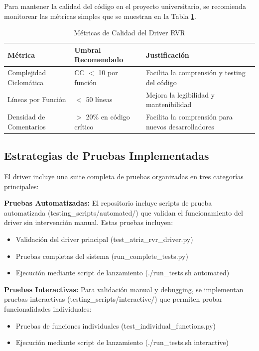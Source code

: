 \documentclass[11pt]{article}
\newcommand{\code}[1]{\textcolor{codeblue}{\url{#1}}}
\numberwithin{figure}{section}
\numberwithin{table}{section}
\def\code#1{#1}%
\begin{document}
Para mantener la calidad del código en el proyecto universitario, se recomienda monitorear las métricas simples que se muestran en la Tabla \ref{tab:metricas_calidad}.

\begin{table}[htbp]
\centering
\caption{Métricas de Calidad del Driver RVR}
\label{tab:metricas_calidad}
\begin{tabular}{|p{}|p{}|p{}|}
\hline
\textbf{Métrica} & \textbf{Umbral Recomendado} & \textbf{Justificación} \\
\hline
Complejidad Ciclomática & CC $<$ 10 por función & Facilita la comprensión y testing del código \\
\hline
Líneas por Función & $<$ 50 líneas & Mejora la legibilidad y mantenibilidad \\
\hline
Densidad de Comentarios & $>$ 20\% en código crítico & Facilita la comprensión para nuevos desarrolladores \\
\hline
\end{tabular}
\end{table}


\subsection{Estrategias de Pruebas Implementadas}

El driver incluye una suite completa de pruebas organizadas en tres categorías principales:

\textbf{Pruebas Automatizadas:} El repositorio incluye scripts de prueba automatizada (\code{testing\_scripts/automated/}) que validan el funcionamiento del driver sin intervención manual. Estas pruebas incluyen:
\begin{itemize}
    \item Validación del driver principal (\code{test\_atriz\_rvr\_driver.py})
    \item Pruebas completas del sistema (\code{run\_complete\_tests.py})
    \item Ejecución mediante script de lanzamiento (\code{./run\_tests.sh automated})
\end{itemize}

\textbf{Pruebas Interactivas:} Para validación manual y debugging, se implementan pruebas interactivas (\code{testing\_scripts/interactive/}) que permiten probar funcionalidades individuales:
\begin{itemize}
    \item Pruebas de funciones individuales (\code{test\_individual\_functions.py})
    \item Ejecución mediante script de lanzamiento (\code{./run\_tests.sh interactive})
\end{itemize}
\end{document}
